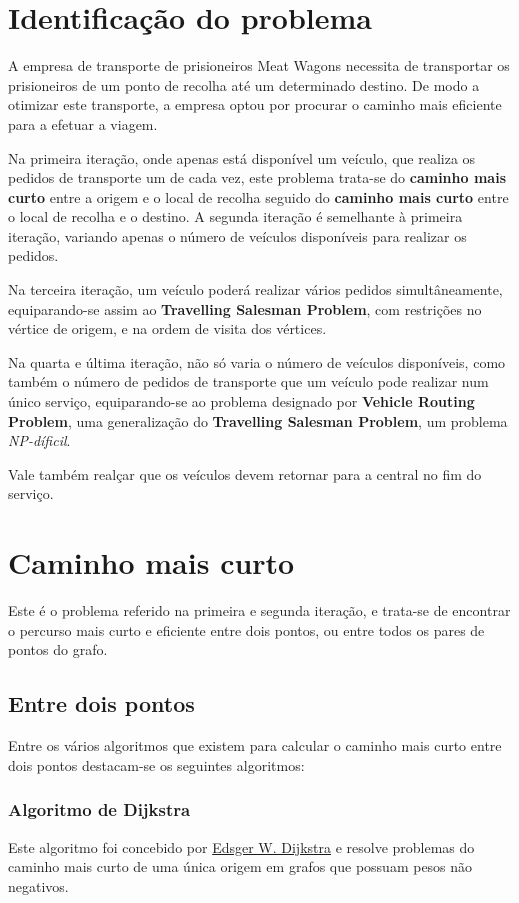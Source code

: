 \documentclass[article, a4paper, 12pt, oneside]{memoir}
\begin{document}
\section{Identificação do problema}

A empresa de transporte de prisioneiros Meat Wagons necessita de transportar os prisioneiros  de um ponto de recolha até um determinado destino. De modo a otimizar este transporte, a empresa optou por procurar o caminho mais eficiente para a efetuar a viagem.

Na primeira iteração, onde apenas está disponível um veículo, que realiza os pedidos de transporte um de cada vez, este problema trata-se do \textbf{caminho mais curto} entre a origem e o local de recolha seguido do \textbf{caminho mais curto} entre o local de recolha e o destino. A segunda iteração é semelhante à primeira iteração, variando apenas o número de veículos disponíveis para realizar os pedidos.

Na terceira iteração, um veículo poderá realizar vários pedidos simultâneamente, equiparando-se assim ao \textbf{Travelling Salesman Problem}, com restrições no vértice de origem, e na ordem de visita dos vértices.

Na quarta e última iteração, não só varia o número de veículos disponíveis, como também o número de pedidos de transporte que um veículo pode realizar num único serviço, equiparando-se ao problema designado por \textbf{Vehicle Routing Problem}, uma generalização do \textbf{Travelling Salesman Problem}, um problema \emph{NP-díficil}.

Vale também realçar que os veículos devem retornar para a central no fim do serviço.

\section{Caminho mais curto}
Este é o problema referido na primeira e segunda iteração, e trata-se de encontrar o percurso mais curto e eficiente entre dois pontos, ou entre todos os pares de pontos do grafo.

\subsection{Entre dois pontos}
Entre os vários algoritmos que existem para calcular o caminho mais curto entre dois pontos destacam-se os seguintes algoritmos:

\subsubsection{Algoritmo de Dijkstra}
Este algoritmo foi concebido por \href{https://en.wikipedia.org/wiki/Edsger_W._Dijkstra}{Edsger W. Dijkstra} e resolve problemas do caminho mais curto de uma única origem em grafos que possuam pesos não negativos.
\end{document}
